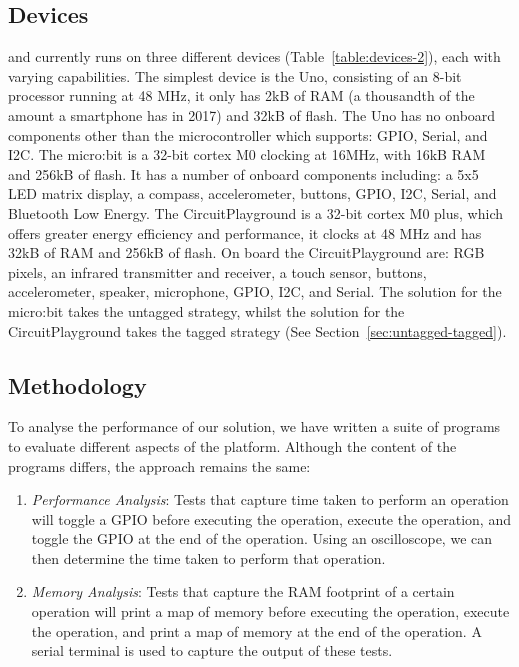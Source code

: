 \subsection{Devices}

\MC and \CO currently runs on three different devices (Table~\ref{table:devices-2}), each with varying capabilities. The simplest device is the Uno, consisting of an 8-bit processor running at 48 MHz, it only has 2kB of RAM (a thousandth of the amount a smartphone has in 2017) and 32kB of flash. The Uno has no onboard components other than the microcontroller which supports: GPIO, Serial, and I2C. The micro:bit is a 32-bit cortex M0 clocking at 16MHz, with 16kB RAM and 256kB of flash. It has a number of onboard components including: a 5x5 LED matrix display, a compass, accelerometer, buttons, GPIO, I2C, Serial, and Bluetooth Low Energy. The CircuitPlayground is a 32-bit cortex M0 plus, which offers greater energy efficiency and performance, it clocks at 48 MHz and has 32kB of RAM and 256kB of flash. On board the CircuitPlayground are: RGB pixels, an infrared transmitter and receiver, a touch sensor, buttons, accelerometer, speaker, microphone, GPIO, I2C, and Serial. The solution for the micro:bit takes the untagged strategy, whilst the solution for the CircuitPlayground takes the tagged strategy (See Section~\ref{sec:untagged-tagged}).

\subsection{Methodology}

To analyse the performance of our solution, we have written a suite of programs to evaluate different aspects of the platform. Although the content of the programs differs, the approach remains the same:

\begin{enumerate}
    \item \textit{Performance Analysis}: Tests that capture time taken to perform an operation will toggle a GPIO before executing the operation, execute the operation, and toggle the GPIO at the end of the operation. Using an oscilloscope, we can then determine the time taken to perform that operation.

    \item \textit{Memory Analysis}: Tests that capture the RAM footprint of a certain operation will print a map of memory before executing the operation, execute the operation, and print a map of memory at the end of the operation. A serial terminal is used to capture the output of these tests.
\end{enumerate}

